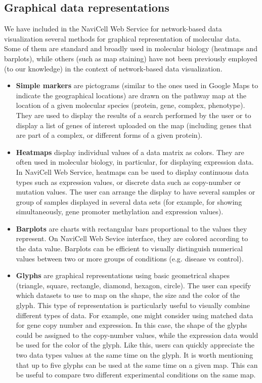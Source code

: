 \documentclass[a4,center,fleqn]{NAR}
\begin{document}
\subsection{Graphical data representations}

We have included in the NaviCell Web Service for network-based data visualization several methods
for graphical representation of molecular data. Some of them are standard
and broadly used in molecular biology (heatmaps and barplots), while others (such as map
staining) have not been previously employed (to our knowledge) in the context of network-based
data visualization.

\begin{itemize}

\item \textbf{Simple markers} are pictograms (similar to the ones used in Google Maps
to indicate the geographical locations) are drawn on the pathway map at the location
of a given molecular species (protein, gene, complex, phenotype). They are used to display the
results of a search performed by the user or to display a list of genes of interest
uploaded on the map (including genes that are part of a complex, or different forms of a given protein).

\item \textbf{Heatmaps} display individual values of a data matrix as
colors. They are often used in molecular biology, in particular, for displaying expression
data. In NaviCell Web Service, heatmaps can be used to
display continuous data types such as expression values, or discrete data such
as copy-number or mutation values. The user can arrange the display to have
several samples or group of samples displayed in several data sets
(for example, for showing simultaneously, gene promoter methylation and expression values).

\item \textbf{Barplots} are charts with rectangular bars proportional to the values
they represent. On NaviCell Web Sevice interface, they are colored according to the
data value. Barplots can be efficient to visually distinguish numerical
values between two or more groups of conditions (e.g. disease vs control).

\item \textbf{Glyphs} are graphical representations using basic geometrical
shapes (triangle, square, rectangle, diamond, hexagon, circle). The user can specify
which datasets to use to map on the shape, the size and the color of the glyph. This
type of representation is particularly useful to visually combine different
types of data. For example, one might consider using matched data for
gene copy number and expression. In this case, the shape of the
glyphs could be assigned to the copy-number values, while the expression data
would be used for the color of the glyph. Like this, users can quickly
appreciate the two data types values at the same time on the glyph. It is worth
mentioning that up to five glyphs can be used at the same time on a given map.
This can be useful to compare two different experimental conditions on the same
map.


\end{itemize}
\end{document}
